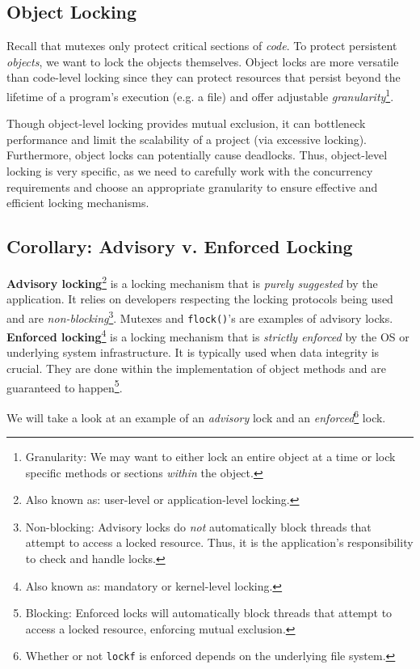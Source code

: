 \documentclass{report}
\newcommand{\definitionBegin}[1]{\begin{tcolorbox}[title={Definition: #1}]}
\newcommand{\definitionEnd}{\end{tcolorbox}}
\begin{document}
\subsection{Object Locking}
Recall that mutexes only protect critical sections of \textit{code}. To protect persistent
\textit{objects}, we want to lock the objects themselves. Object locks are more versatile than
code-level locking since they can protect resources that persist beyond the lifetime of a program's
execution (e.g. a file) and offer adjustable \textit{granularity}\footnote{Granularity: We may want
  to either lock an entire object at a time or lock specific methods or sections \textit{within} the
  object.}.

Though object-level locking provides mutual exclusion, it can bottleneck performance and limit the
scalability of a project (via excessive locking). Furthermore, object locks can potentially cause
deadlocks. Thus, object-level locking is very specific, as we need to carefully work with the
concurrency requirements and choose an appropriate granularity to ensure effective and efficient
locking mechanisms.


\subsection*{Corollary: Advisory v. Enforced Locking}
\definitionBegin{Advisory and Enforced Locking}
\textbf{Advisory locking}\footnote{Also known as: user-level or application-level locking.} is a
locking mechanism that is \textit{purely suggested} by the application. It relies on developers
respecting the locking protocols being used and are \textit{non-blocking}\footnote{Non-blocking:
  Advisory locks do \textit{not} automatically block threads that attempt to access a locked
  resource. Thus, it is the application's responsibility to check and handle locks.}. Mutexes and
\texttt{flock()}'s are examples of advisory locks.
\tcblower
\textbf{Enforced locking}\footnote{Also known as: mandatory or kernel-level locking.} is a locking
mechanism that is \textit{strictly enforced} by the OS or underlying system infrastructure. It is
typically used when data integrity is crucial. They are done within the implementation of object
methods and are guaranteed to happen\footnote{Blocking: Enforced locks will automatically block
  threads that attempt to access a locked resource, enforcing mutual exclusion.}.
\definitionEnd

We will take a look at an example of an \textit{advisory} lock and an
\textit{enforced}\footnote{Whether or not \texttt{lockf} is enforced depends on the underlying file
  system.} lock.
\end{document}

